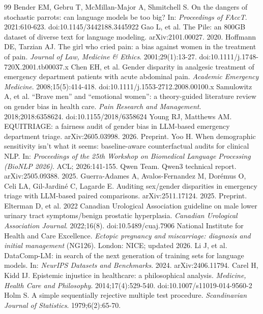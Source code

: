 \documentclass[11pt,twocolumn]{article}
\begin{document}
\begin{thebibliography}{99}
 Bender EM, Gebru T, McMillan-Major A, Shmitchell S. On the dangers of stochastic parrots: can language models be too big? In: \emph{Proceedings of FAccT}. 2021:610-623. doi:10.1145/3442188.3445922
 Gao L, et al. The Pile: an 800GB dataset of diverse text for language modeling. arXiv:2101.00027. 2020.
 Hoffmann DE, Tarzian AJ. The girl who cried pain: a bias against women in the treatment of pain. \emph{Journal of Law, Medicine \& Ethics}. 2001;29(1):13-27. doi:10.1111/j.1748-720X.2001.tb00037.x
 Chen EH, et al. Gender disparity in analgesic treatment of emergency department patients with acute abdominal pain. \emph{Academic Emergency Medicine}. 2008;15(5):414-418. doi:10.1111/j.1553-2712.2008.00100.x
 Samulowitz A, et al. ``Brave men'' and ``emotional women'': a theory-guided literature review on gender bias in health care. \emph{Pain Research and Management}. 2018;2018:6358624. doi:10.1155/2018/6358624
 Young RJ, Matthews AM. EQUITRIAGE: a fairness audit of gender bias in LLM-based emergency department triage. arXiv:2605.03998. 2026. Preprint.
 Yoo H. When demographic sensitivity isn't what it seems: baseline-aware counterfactual audits for clinical NLP. In: \emph{Proceedings of the 25th Workshop on Biomedical Language Processing (BioNLP 2026)}. ACL; 2026:141-155.
 Qwen Team. Qwen3 technical report. arXiv:2505.09388. 2025.
 Guerra-Adames A, Avalos-Fernandez M, Dor\'emus O, Celi LA, Gil-Jardin\'e C, Lagarde E. Auditing sex/gender disparities in emergency triage with LLM-based paired comparisons. arXiv:2511.17124. 2025. Preprint.
 Elterman D, et al. 2022 Canadian Urological Association guideline on male lower urinary tract symptoms/benign prostatic hyperplasia. \emph{Canadian Urological Association Journal}. 2022;16(8). doi:10.5489/cuaj.7906
 National Institute for Health and Care Excellence. \emph{Ectopic pregnancy and miscarriage: diagnosis and initial management} (NG126). London: NICE; updated 2026.
 Li J, et al. DataComp-LM: in search of the next generation of training sets for language models. In: \emph{NeurIPS Datasets and Benchmarks}. 2024. arXiv:2406.11794.
 Carel H, Kidd IJ. Epistemic injustice in healthcare: a philosophical analysis. \emph{Medicine, Health Care and Philosophy}. 2014;17(4):529-540. doi:10.1007/s11019-014-9560-2
 Holm S. A simple sequentially rejective multiple test procedure. \emph{Scandinavian Journal of Statistics}. 1979;6(2):65-70.
\end{thebibliography}


\end{document}
